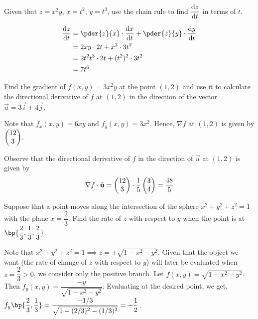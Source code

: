 \documentclass{echw}
\begin{document}

    \problem{}
        Given that $z = x^2y$, $x = t^2$, $y = t^3$, use the chain rule to find $\dfrac{\mathrm{d} z}{\mathrm{d} t}$ in terms of $t$.

    \solution
        \begin{align*}
            \der{z}{t} &= \pder{z}{x} \cdot \der{x}{t} + \pder{z}{y} \cdot \der{y}{t}\\
            &= 2xy \cdot 2t + x^2 \cdot 3t^2\\
            &= 2t^2t^3 \cdot 2t + (t^2)^2 \cdot 3t^2\\
            &= 7t^6
        \end{align*}


    \problem{}
        Find the gradient of $f(x, y) = 3x^2y$ at the point $(1, 2)$ and use it to calculate the directional derivative of $f$ at $(1, 2)$ in the direction of the vector $\vec u = 3\vec i + 4\vec j$.

    \solution
        Note that $f_x(x, y) = 6xy$ and $f_y(x, y) = 3x^2$. Hence, $\nabla f$ at $(1, 2)$ is given by $\begin{pmatrix} 12 \\ 3 \end{pmatrix}$. 
        
        
        Observe that the directional derivative of $f$ in the direction of $\vec u$ at $(1, 2)$ is given by \[\nabla f \cdot \hat{\mathbf{u}} = \begin{pmatrix} 12 \\ 3 \end{pmatrix} \cdot \dfrac15 \begin{pmatrix} 3 \\ 4 \end{pmatrix} = \dfrac{48}5\]


    \problem{}
        Suppose that a point moves along the intersection of the sphere $x^2 + y^2 + z^2 = 1$ with the plane $x = \dfrac23$. Find the rate of $z$ with respect to $y$ when the point is at $\bp{\dfrac23, \dfrac13, \dfrac23}$.

    \solution
        Note that $x^2 + y^2 + z^2 = 1 \implies z = \pm \sqrt{1 - x^2 - y^2}$. Given that the object we want (the rate of change of $z$ with respect to $y$) will later be evaluated when $z = \dfrac23 > 0$, we consider only the positive branch. Let $f(x, y) = \sqrt{1 - x^2 - y^2}$. Then $f_y(x, y) = \dfrac{-y}{\sqrt{1 - x^2 - y^2}}$. Evaluating at the desired point, we get, $f_y\bp{\dfrac23, \dfrac13} = \dfrac{-1/3}{\sqrt{1 - (2/3)^2 - (1/3)^2}} = -\dfrac12$.

\end{document}
